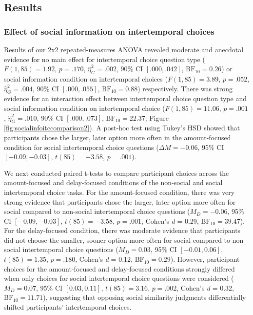 \documentclass[
  pub,floatsintext]{apa6}
\begin{document}
\hypertarget{results-1}{%
\subsection{Results}\label{results-1}}

\hypertarget{effect-of-social-information-on-intertemporal-choices-1}{%
\subsubsection{Effect of social information on intertemporal choices}\label{effect-of-social-information-on-intertemporal-choices-1}}

Results of our 2x2 repeated-measures ANOVA revealed moderate and anecdotal evidence for no main effect for intertemporal choice question type (\(F(1, 85) = 1.92\), \(p = .170\), \(\hat{\eta}^2_G = .002\), 90\% CI \([.000, .042]\), \(\mathrm{BF}_{\textrm{10}} = 0.26\)) or social information condition on intertemporal choices (\(F(1, 85) = 3.89\), \(p = .052\), \(\hat{\eta}^2_G = .004\), 90\% CI \([.000, .055]\), \(\mathrm{BF}_{\textrm{10}} = 0.88\)) respectively. There was strong evidence for an interaction effect between intertemporal choice question type and social information condition on intertemporal choice (\(F(1, 85) = 11.06\), \(p = .001\), \(\hat{\eta}^2_G = .010\), 90\% CI \([.000, .073]\), \(\mathrm{BF}_{\textrm{10}} = 22.37\); Figure \ref{fig:socialinfoitccomparison2}). A post-hoc test using Tukey's HSD showed that participants chose the larger, later option more often in the amount-focused condition for social intertemporal choice questions (\(\Delta M = -0.06\), 95\% CI \([-0.09, -0.03]\), \(t(85) = -3.58\), \(p = .001\)).

We next conducted paired t-tests to compare participant choices across the amount-focused and delay-focused conditions of the non-social and social intertemporal choice tasks. For the amount-focused condition, there was very strong evidence that participants chose the larger, later option more often for social compared to non-social intertemporal choice questions (\(M_D = -0.06\), 95\% CI \([-0.09, -0.03]\), \(t(85) = -3.58\), \(p = .001\), Cohen's \emph{d} = 0.29, \(\mathrm{BF}_{\textrm{10}} = 39.47\)). For the delay-focused condition, there was moderate evidence that participants did not choose the smaller, sooner option more often for social compared to non-social intertemporal choice questions (\(M_D = 0.03\), 95\% CI \([-0.01, 0.06]\), \(t(85) = 1.35\), \(p = .180\), Cohen's \emph{d} = 0.12, \(\mathrm{BF}_{\textrm{10}} = 0.29\)). However, participant choices for the amount-focused and delay-focused conditions strongly differed when only choices for social intertemporal choice questions were considered (\(M_D = 0.07\), 95\% CI \([0.03, 0.11]\), \(t(85) = 3.16\), \(p = .002\), Cohen's \emph{d} = 0.32, \(\mathrm{BF}_{\textrm{10}} = 11.71\)), suggesting that opposing social similarity judgments differentially shifted participants' intertemporal choices.
\end{document}
